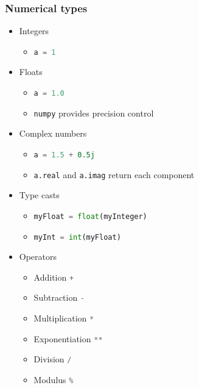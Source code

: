 \documentclass[xcolor=table,10pt,final]{beamer}
\begin{document}
\begin{frame}[fragile]
  \frametitle{Numerical types}
  \begin{itemize}
    \item Integers
      \begin{itemize}
        \item \lstinline[language=python]|a = 1|
      \end{itemize}
    \item Floats
      \begin{itemize}
        \item \lstinline[language=python]|a = 1.0|
        \item {\tt numpy} provides precision control
      \end{itemize}
    \item Complex numbers
      \begin{itemize}
        \item \lstinline[language=python]|a = 1.5 + 0.5j|
        \item \lstinline[language=python]|a.real| and \lstinline[language=python]|a.imag| return each component
      \end{itemize}
    \item Type casts
      \begin{itemize}
        \item \lstinline[language=python]|myFloat = float(myInteger)|
        \item \lstinline[language=python]|myInt = int(myFloat)|
      \end{itemize}
    \item Operators
      \begin{itemize}
        \item Addition \lstinline[language=python]|+|
        \item Subtraction \lstinline[language=python]|-|
        \item Multiplication \lstinline[language=python]|*|
        \item Exponentiation \lstinline[language=python]|**|
        \item Division \lstinline[language=python]|/|
        \item Modulus \lstinline[language=python]|%|
      \end{itemize}
  \end{itemize}
\end{frame}
\end{document}
